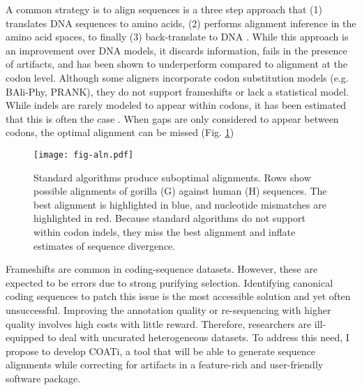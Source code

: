 A common strategy is to align sequences is a three step approach that (1)
translates DNA sequences to amino acids, (2) performs alignment inference
in the amino acid spaces, to finally (3) back-translate to DNA
\parencite{bininda2005transalign, abascal2010translatorx}.
While this approach is an improvement over DNA models, it discards information,
fails in the presence of artifacts, and has been shown to underperform compared
to alignment at the codon level.
Although some aligners incorporate codon substitution models (e.g. BAli-Phy,
PRANK), they do not support frameshifts or lack a statistical model.
While indels are rarely modeled to appear within codons, it has been estimated
that this is often the case \parencite{indel_phases_zhu_2019}.
When gaps are only considered to appear between codons, the optimal alignment
can be missed (Fig. \ref{fig:indels})

\begin{figure}[h!]
  \begin{minipage}[c]{0.6\textwidth}
    \texttt{[image: fig-aln.pdf]}
  \end{minipage}\hfill
  \begin{minipage}[c]{0.4\textwidth}
	\caption{Standard algorithms produce suboptimal alignments.
		Rows show possible alignments of gorilla (G) against human (H) sequences.
		The best alignment is highlighted in blue, and nucleotide mismatches are highlighted in red.
		Because standard algorithms do not support within codon indels, they miss the best
		alignment and inflate estimates of sequence divergence.}
	\label{fig:indels}
  \end{minipage}
\end{figure}

Frameshifts are common in coding-sequence datasets.
However, these are expected to be errors due to strong purifying selection.
Identifying canonical coding sequences to patch this issue is the most
accessible solution and yet often unsuccessful.
Improving the annotation quality or re-sequencing with higher quality involves
high costs with little reward.
Therefore, researchers are ill-equipped to deal with uncurated heterogeneous
datasets.
To address this need, I propose to develop COATi, a tool that will be able to
generate sequence alignments while correcting for artifacts in a feature-rich
and user-friendly software package.

